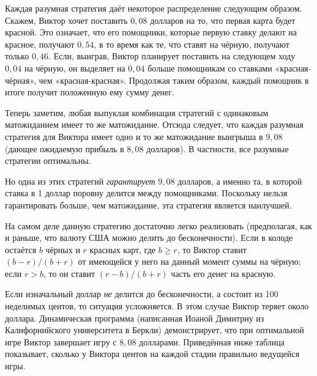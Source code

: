\documentclass[twoside]{book}
\begin{document}
Каждая разумная стратегия даёт некоторое распределение следующим образом.
Скажем, Виктор хочет поставить $0{,}08$ долларов на то, что первая карта будет красной.
Это означает, что его помощники, которые первую ставку делают на красное, получают $0{,}54$, в то время как те, что ставят на чёрную, получают только $0{,}46$.
Если, выиграв, Виктор планирует поставить на следующем ходу $0{,}04$ на чёрную, он выделяет на $0{,}04$ больше помощникам со ставками «красная-чёрная», чем «красная-красная».
Продолжая таким образом, каждый помощник в итоге получит положенную ему сумму денег.

Теперь заметим, любая выпуклая комбинация стратегий с одинаковым матожиданием имеет то же матожидание.
Отсюда следует, что каждая разумная стратегия для Виктора имеет одно и то же матожидание выигрыша в $9{,}08$ (дающее ожидаемую прибыль в $8{,}08$ долларов).
В частности, все разумные стратегии оптимальны.

Но одна из этих стратегий \emph{гарантирует} $9{,}08$ долларов, а именно та, в которой ставка в 1 доллар поровну делится между помощниками.
Поскольку нельзя гарантировать больше, чем матожидание, эта стратегия является наилучшей.\heart

На самом деле данную стратегию достаточно легко реализовать (предполагая, как и раньше, что валюту США можно делить до бесконечности).
Если в колоде остаётся $b$ чёрных и $r$ красных карт, где $b\ge r$, то Виктор ставит $(b - r)/(b + r)$ от имеющейся у него на данный момент суммы на чёрную; если $r > b$, то он ставит $(r - b)/(b + r)$ часть его денег на красную.

\medskip

Если изначальный доллар \emph{не} делится до бесконечности, а состоит из 100 неделимых центов, то ситуация усложняется.
В этом случае Виктор теряет около доллара.
Динамическая программа (написанная Иоаной Димитриу %
из Калифорнийского университета в Беркли) демонстрирует, что при оптимальной игре Виктор завершает игру с $8{,}08$ долларами.
Приведённая ниже таблица показывает, сколько у Виктора центов на каждой стадии правильно ведущейся игры.
\end{document}
